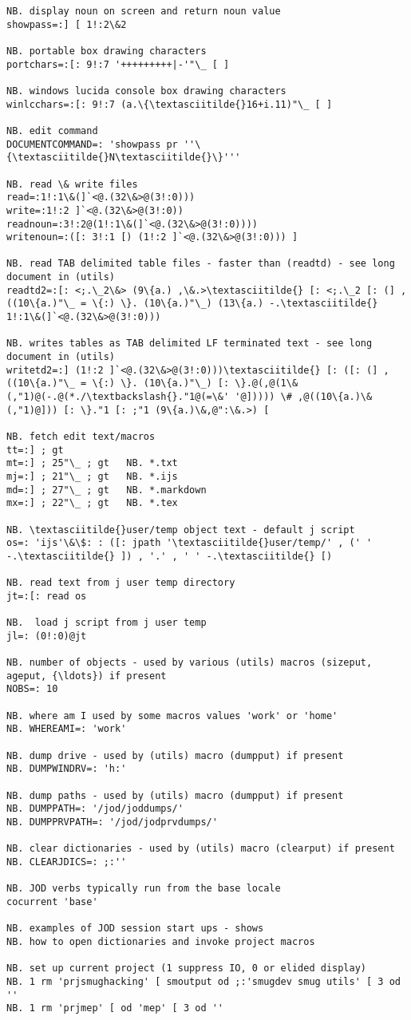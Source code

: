 \documentclass[11pt,letter,landscape]{article}
\begin{document}
\begin{Verbatim}[commandchars=\\\{\}]
NB. display noun on screen and return noun value
showpass=:] [ 1!:2\&2

NB. portable box drawing characters
portchars=:[: 9!:7 '+++++++++|-'"\_ [ ]

NB. windows lucida console box drawing characters
winlcchars=:[: 9!:7 (a.\{\textasciitilde{}16+i.11)"\_ [ ]

NB. edit command 
DOCUMENTCOMMAND=: 'showpass pr ''\{\textasciitilde{}N\textasciitilde{}\}'''

NB. read \& write files
read=:1!:1\&(]`<@.(32\&>@(3!:0)))
write=:1!:2 ]`<@.(32\&>@(3!:0))
readnoun=:3!:2@(1!:1\&(]`<@.(32\&>@(3!:0))))
writenoun=:([: 3!:1 [) (1!:2 ]`<@.(32\&>@(3!:0))) ]

NB. read TAB delimited table files - faster than (readtd) - see long document in (utils)
readtd2=:[: <;.\_2\&> (9\{a.) ,\&.>\textasciitilde{} [: <;.\_2 [: (] , ((10\{a.)"\_ = \{:) \}. (10\{a.)"\_) (13\{a.) -.\textasciitilde{} 1!:1\&(]`<@.(32\&>@(3!:0)))

NB. writes tables as TAB delimited LF terminated text - see long document in (utils)
writetd2=:] (1!:2 ]`<@.(32\&>@(3!:0)))\textasciitilde{} [: ([: (] , ((10\{a.)"\_ = \{:) \}. (10\{a.)"\_) [: \}.@(,@(1\&(,"1)@(-.@(*./\textbackslash{}."1@(=\&' '@])))) \# ,@((10\{a.)\&(,"1)@])) [: \}."1 [: ;"1 (9\{a.)\&,@":\&.>) [

NB. fetch edit text/macros
tt=:] ; gt
mt=:] ; 25"\_ ; gt   NB. *.txt
mj=:] ; 21"\_ ; gt   NB. *.ijs
md=:] ; 27"\_ ; gt   NB. *.markdown
mx=:] ; 22"\_ ; gt   NB. *.tex

NB. \textasciitilde{}user/temp object text - default j script
os=: 'ijs'\&\$: : ([: jpath '\textasciitilde{}user/temp/' , (' ' -.\textasciitilde{} ]) , '.' , ' ' -.\textasciitilde{} [)
 
NB. read text from j user temp directory
jt=:[: read os
 
NB.  load j script from j user temp
jl=: (0!:0)@jt

NB. number of objects - used by various (utils) macros (sizeput, ageput, {\ldots}) if present
NOBS=: 10

NB. where am I used by some macros values 'work' or 'home'
NB. WHEREAMI=: 'work'

NB. dump drive - used by (utils) macro (dumpput) if present
NB. DUMPWINDRV=: 'h:'

NB. dump paths - used by (utils) macro (dumpput) if present
NB. DUMPPATH=: '/jod/joddumps/'
NB. DUMPPRVPATH=: '/jod/jodprvdumps/'

NB. clear dictionaries - used by (utils) macro (clearput) if present
NB. CLEARJDICS=: ;:''

NB. JOD verbs typically run from the base locale 
cocurrent 'base'

NB. examples of JOD session start ups - shows
NB. how to open dictionaries and invoke project macros

NB. set up current project (1 suppress IO, 0 or elided display)
NB. 1 rm 'prjsmughacking' [ smoutput od ;:'smugdev smug utils' [ 3 od ''
NB. 1 rm 'prjmep' [ od 'mep' [ 3 od ''


    \end{Verbatim}
\end{document}

